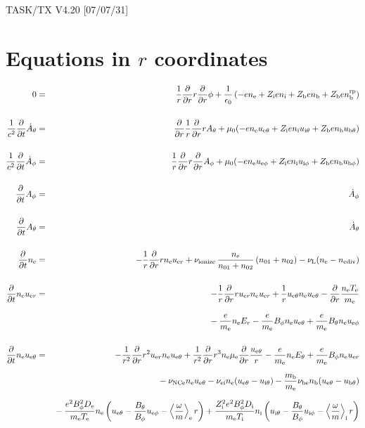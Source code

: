 \documentclass[11pt]{article}
\def\r#1{{\rm#1}}
\def\ddt{\frac{\partial}{\partial t}}
\def\ddr{\frac{\partial}{\partial r}}
\def\ave#1{\left\langle#1\right\rangle}
\def\me{m_\r{e}}
\def\mb{m_\r{b}}
\def\mue{\mu_\r{e}}
\def\De{D_\r{e}}
\def\Di{D_\r{i}}
\def\ne{n_\r{e}}
\def\ni{n_\r{i}}
\def\nb{n_\r{b}}
\def\uer{u_{\r{e}r}}
\def\ueth{u_{\r{e}\theta}}
\def\uith{u_{\r{i}\theta}}
\def\ubth{u_{\r{b}\theta}}
\def\ueph{u_{\r{e}\phi}}
\def\uiph{u_{\r{i}\phi}}
\def\ubph{u_{\r{b}\phi}}
\def\Er{E_r}
\def\Eth{E_\theta}
\def\Bth{B_\theta}
\def\Bph{B_\phi}
\def\Athd{\dot{A}_\theta}
\def\Aphd{\dot{A}_\phi}
\def\Ath{A_\theta}
\def\Aph{A_\phi}
\def\Te{T_\r{e}}
\def\Ti{T_\r{i}}
\def\nna{n_{01}}
\def\nnb{n_{02}}
\def\Zi{Z_\r{i}}
\def\Zb{Z_\r{b}}
\def\nbrp{n_\r{b}^\r{rp}}
\def\nuNCe{\nu_\r{NCe}}
\def\nuL{\nu_\r{L}}
\def\nuion{\nu_\r{ionize}}
\def\nediv{n_\r{ediv}}
\begin{document}
\begin{center}
TASK/TX V4.20 [07/07/31]
\end{center}

\section{Equations in $r$ coordinates}
\vspace{-5mm}

\begin{eqnarray}
%
%
  0 &=&
%
    \frac{1}{r} \ddr r \ddr \phi
%
  + \frac{1}{\epsilon_0}
%
    \left(-e \ne + \Zi e \ni + \Zb e \nb + \Zb e \nbrp \right)
\\[5mm]
%
%
  \frac{1}{c^2} \ddt \Athd &=&
%
    \ddr \frac{1}{r} \ddr r \Ath
%
  + \mu_0 (-e \ne \ueth + \Zi e \ni \uith + \Zb e \nb \ubth)
\\[5mm]
%
%
  \frac{1}{c^2} \ddt \Aphd &=&
%
  \frac{1}{r} \ddr r \ddr \Aph
%
  + \mu_0 (-e \ne \ueph + \Zi e \ni \uiph + \Zb e \nb \ubph)
%
\\[5mm]
%
%
  \ddt \Aph &=&
%
  \Aphd
\\[5mm]
%
%
  \ddt \Ath &=&
%
  \Athd
\\[5mm]
%
%
  \ddt\ne &=&
%
  - \frac{1}{r} \ddr r \ne \uer 
%
  + \nuion\, \frac{\ne}{\nna+\nnb}\, (\nna+\nnb)
%
  - \nuL (\ne - \nediv)
\\[5mm]
%
%
  \ddt \ne \uer &=&
%
  - \frac{1}{r} \ddr r \uer \ne \uer
%
  + \frac{1}{r} \ueth \ne \ueth
%
  - \ddr \frac{\ne \Te}{\me}
\nonumber\\[3mm]&&{}
%
  - \frac{e}{\me} \ne \Er
%
  - \frac{e}{\me} \Bph \ne \ueth
%
  + \frac{e}{\me} \Bth \ne \ueph
\\[5mm]
%
%
  \ddt \ne \ueth &=&
%
  - \frac{1}{r^2} \ddr r^2 \uer \ne \ueth
%
  + \frac{1}{r^2} \ddr r^3 \ne \mue \ddr \frac{\ueth}{r}
%
  - \frac{e}{\me} \ne \Eth
%
  + \frac{e}{\me} \Bph \ne \uer
\nonumber\\[2.5mm]&&{}
%
  - \nuNCe \ne \ueth
%
  - \nu_\r{ei} \ne (\ueth - \uith)
%
  - \frac{\mb}{\me} \nu_\r{be} \nb (\ueth - \ubth)
\nonumber\\[2.5mm]&&{}
%
  - \frac{e^2 \Bph^2 \De}{\me\Te}\ne
    \left(\ueth - \frac{\Bth}{\Bph}\ueph - \ave{\frac{\omega}{m}}_\r{e}
     r \right)
%
   + \frac{\Zi^2 e^2 \Bph^2 \Di}{\me\Ti}\ni
    \left(\uith - \frac{\Bth}{\Bph}\uiph - \ave{\frac{\omega}{m}}_\r{i}
     r \right)
\nonumber\\[2.5mm]&&{}
%

\end{eqnarray}
\end{document}
